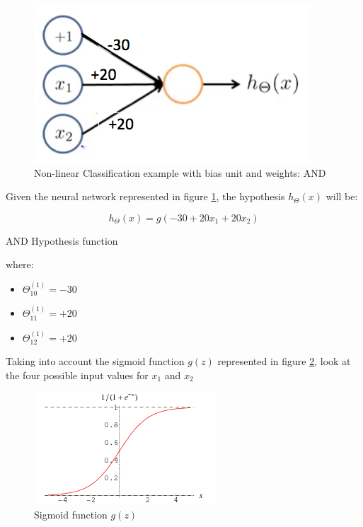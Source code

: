 \begin{mdframed}[style=MyFrame]
\begin{figure}[H]
\begin{center}
\includegraphics[scale=0.25]{images/and2}
\end{center}
\caption{Non-linear Classification example with bias unit and weights: AND} 
\label{and2}
\end{figure}


Given the neural network represented in figure \ref{and2}, the hypothesis $h_\Theta(x)$ will be:

\begin{eqfloat}[H]
\begin{equation}
	h_{\Theta}(x) = g(-30 + 20x_1 + 20x_2 ) 
\end{equation}
      \addtocounter{equation}{-1}
        \caption{  AND Hypothesis function}
        \label{eq:andhyp}
\end{eqfloat}

where:

\begin{itemize}
\item $\Theta_{10}^{(1)} = -30$
\item $\Theta_{11}^{(1)} = +20$
\item $\Theta_{12}^{(1)} = +20$
\end{itemize}

Taking into account the sigmoid function $g(z)$ represented in figure \ref{sigmoidplot}, look at the four possible input values for $x_1$ and $x_2$ 
 
 
 \begin{figure}[H]
\begin{center}
\includegraphics[scale=0.60]{images/sigmoidplot}
\end{center}
\caption{Sigmoid function $g(z)$} 
\label{sigmoidplot}
\end{figure}



\end{mdframed}
